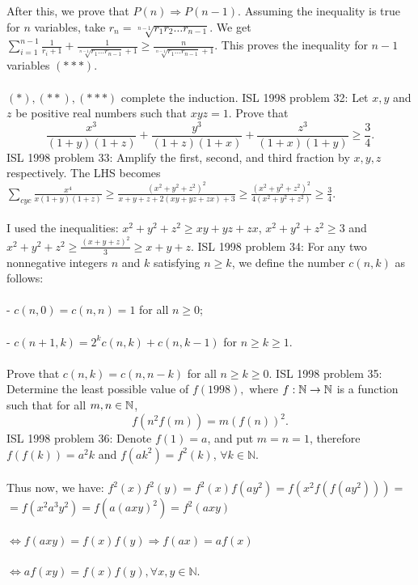 After this, we prove that $P(n)\Rightarrow P(n-1)$. Assuming the inequality is true for $n$ variables, take $r_n=\sqrt[n-1]{r_1r_2\ldots r_{n-1}}$. We get $\sum_{i=1}^{n-1}\frac 1{r_i+1}+\frac 1{\sqrt[n-1]{r_1\ldots r_{n-1}}+1}\ge \frac n{\sqrt[n-1]{r_1\ldots r_{n-1}}+1}$. This proves the inequality for $n-1$ variables $(***)$. \\\\
$(*),(**),(***)$ complete the induction. 
ISL 1998 problem 32:  Let $x,y$ and $z$ be positive real numbers such that $xyz=1$. Prove that
\[
\frac{x^3}{(1 + y)(1 + z)}+\frac{y^3}{(1 + z)(1 + x)}+\frac{z^3}{(1 + x)(1 + y)}
 \geq \frac{3}{4}.
\] 
ISL 1998 problem 33:  Amplify the first, second, and third fraction by $x,y,z$ respectively. The LHS becomes $\sum_{cyc}\frac{x^4}{x(1+y)(1+z)}\ge \frac{(x^2+y^2+z^2)^2}{x+y+z+2(xy+yz+zx)+3}\ge \frac{(x^2+y^2+z^2)^2}{4(x^2+y^2+z^2)}\ge\frac 34$. \\\\
I used the inequalities: $x^2+y^2+z^2\ge xy+yz+zx$, $x^2+y^2+z^2\ge 3$ and $x^2+y^2+z^2\ge \frac{(x+y+z)^2}3\ge x+y+z$. 
ISL 1998 problem 34:  For any two nonnegative integers $n$ and $k$ satisfying $n\geq k$, we define the number $c(n,k)$ as follows: \\\\
- $c\left(n,0\right)=c\left(n,n\right)=1$ for all $n\geq 0$; \\\\
- $c\left(n+1,k\right)=2^kc\left(n,k\right)+c\left(n,k-1\right)$ for $n\geq k\geq 1$. \\\\
Prove that $c\left(n,k\right)=c\left(n,n-k\right)$ for all $n\geq k\geq 0$. 
ISL 1998 problem 35:  Determine the least possible value of $f(1998),$ where $f:\Bbb{N}\to \Bbb{N}$ is a function such that for all $m,n\in {\Bbb N}$,
\[ f\left( n^2f(m)\right) =m\left( f(n)\right) ^2. \] 
ISL 1998 problem 36:  Denote $f(1)=a$, and put $m=n=1$, therefore $f(f(k))=a^2k$ and $f(ak^2)=f^2(k)$, $\forall k \in \mathbb{N}$. \\\\
Thus now, we have: $f^2(x) f^2(y)=f^2(x)f(ay^2)=f(x^2f(f(ay^2)))=$ \\
$=f(x^2a^3y^2)=f(a(axy)^2)=f^2(axy)$ \\\\
$\iff f(axy)=f(x)f(y) \Rightarrow f(ax)=af(x)$ \\\\
$\iff af(xy)=f(x)f(y) , \forall x,y \in \mathbb{N}$. \\\\

